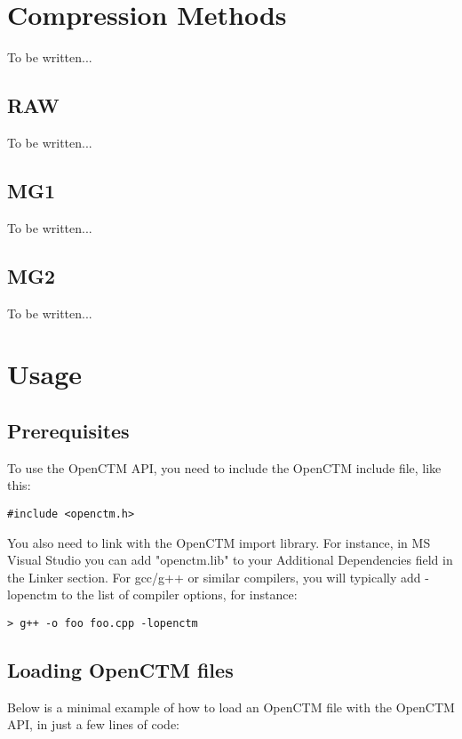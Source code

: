 
\chapter{Compression Methods}
To be written...


\section{RAW}
To be written...


\section{MG1}
To be written...


\section{MG2}
To be written...




\chapter{Usage}

\section{Prerequisites}
To use the OpenCTM API, you need to include the OpenCTM include file, like this:

\begin{lstlisting}
#include <openctm.h>
\end{lstlisting}

You also need to link with the OpenCTM import library. For instance, in MS
Visual Studio you can add "openctm.lib" to your Additional Dependencies field
in the Linker section. For gcc/g++ or similar compilers, you will typically
add -lopenctm to the list of compiler options, for instance:

\begin{lstlisting}
> g++ -o foo foo.cpp -lopenctm
\end{lstlisting}


\section{Loading OpenCTM files}
Below is a minimal example of how to load an OpenCTM file with the OpenCTM API,
in just a few lines of code:

